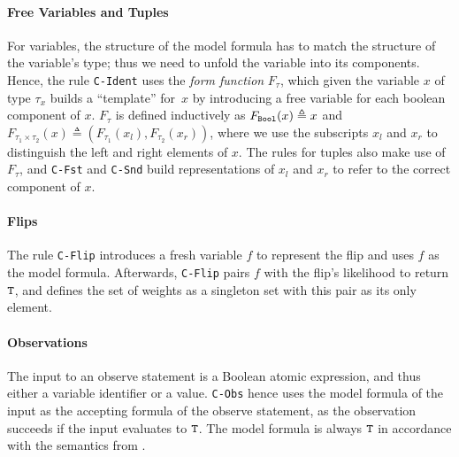 \paragraph{Free Variables and Tuples}
For variables, the structure of the model formula has to match the structure of the variable's type; thus we need to unfold the variable into its components.
Hence, the rule \texttt{C-Ident} uses the \textit{form function} $F_\tau$, which given the variable $x$ of type $\tau_x$ builds a \enquote{template} for~$x$ by introducing a free variable for each boolean component of $x$.
$F_\tau$ is defined inductively as $F_{\texttt{Bool}} (x) \triangleq x$ and $ F_{\tau_1 \times \tau_2}(x) \triangleq (F_{\tau_1}(x_l), F_{\tau_2}(x_r))$, where we use the subscripts $x_l$ and $x_r$ to distinguish the left and right elements of $x$.
The rules for tuples also make use of $F_\tau$, and \texttt{C-Fst} and \texttt{C-Snd} build representations of $x_l$ and $x_r$ to refer to the correct component of $x$.


\paragraph{Flips}
The rule \texttt{C-Flip} introduces a fresh variable $f$ to represent the flip and uses $f$ as the model formula.
Afterwards, \texttt{C-Flip} pairs $f$ with the flip's likelihood to return $\texttt{T}$, and defines the set of weights as a singleton set with this pair as its only element.


\paragraph{Observations}
The input to an observe statement is a Boolean atomic expression, and thus either a variable identifier or a value.
\texttt{C-Obs} hence uses the model formula of the input as the accepting formula of the observe statement, as the observation succeeds if the input evaluates to $\texttt{T}$. 
The model formula is always $\texttt{T}$ in accordance with the semantics from .


